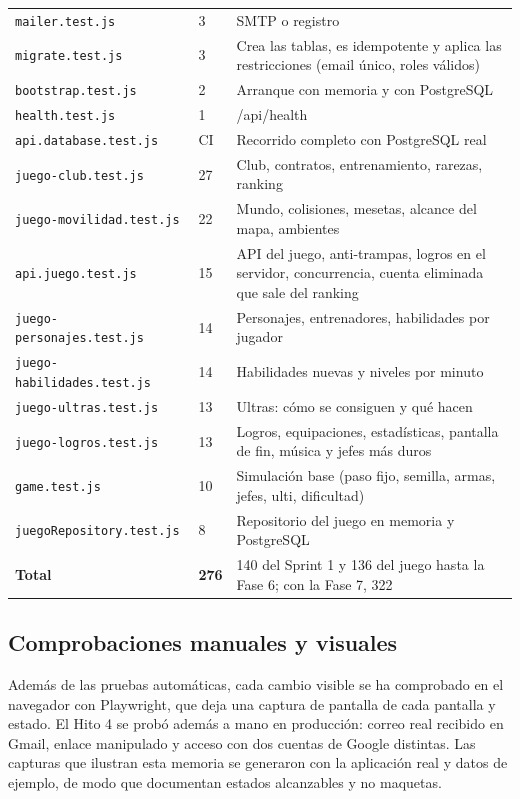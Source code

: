 \begin{longtable}{@{}L{5.0cm} R{1.2cm} L{8.0cm}@{}}
\texttt{mailer\allowbreak.test.js} & 3 & SMTP o registro \\
\texttt{migrate\allowbreak.test.js} & 3 & Crea las tablas, es idempotente y aplica las restricciones (email único, roles válidos) \\
\texttt{bootstrap\allowbreak.test.js} & 2 & Arranque con memoria y con PostgreSQL \\
\texttt{health\allowbreak.test.js} & 1 & /api/health \\
\texttt{api.database\allowbreak.test.js} & CI & Recorrido completo con PostgreSQL real \\
\texttt{juego-club\allowbreak.test.js} & 27 & Club, contratos, entrenamiento, rarezas, ranking \\
\texttt{juego-movilidad\allowbreak.test.js} & 22 & Mundo, colisiones, mesetas, alcance del mapa, ambientes \\
\texttt{api.juego\allowbreak.test.js} & 15 & API del juego, anti-trampas, logros en el servidor, concurrencia, cuenta eliminada que sale del ranking \\
\texttt{juego-personajes\allowbreak.test.js} & 14 & Personajes, entrenadores, habilidades por jugador \\
\texttt{juego-habilidades\allowbreak.test.js} & 14 & Habilidades nuevas y niveles por minuto \\
\texttt{juego-ultras\allowbreak.test.js} & 13 & Ultras: cómo se consiguen y qué hacen \\
\texttt{juego-logros\allowbreak.test.js} & 13 & Logros, equipaciones, estadísticas, pantalla de fin, música y jefes más duros \\
\texttt{game\allowbreak.test.js} & 10 & Simulación base (paso fijo, semilla, armas, jefes, ulti, dificultad) \\
\texttt{juegoRepository\allowbreak.test.js} & 8 & Repositorio del juego en memoria y PostgreSQL \\
\midrule
\textbf{Total} & \textbf{276} & 140 del Sprint 1 y 136 del juego hasta la Fase 6; con la Fase 7, 322 \\*
\bottomrule
\end{longtable}

\subsection{Comprobaciones manuales y visuales}

Además de las pruebas automáticas, cada cambio visible se ha comprobado en el navegador con Playwright, que deja una captura de pantalla de cada pantalla y estado. El Hito 4 se probó además a mano en producción: correo real recibido en Gmail, enlace manipulado y acceso con dos cuentas de Google distintas. Las capturas que ilustran esta memoria se generaron con la aplicación real y datos de ejemplo, de modo que documentan estados alcanzables y no maquetas.

